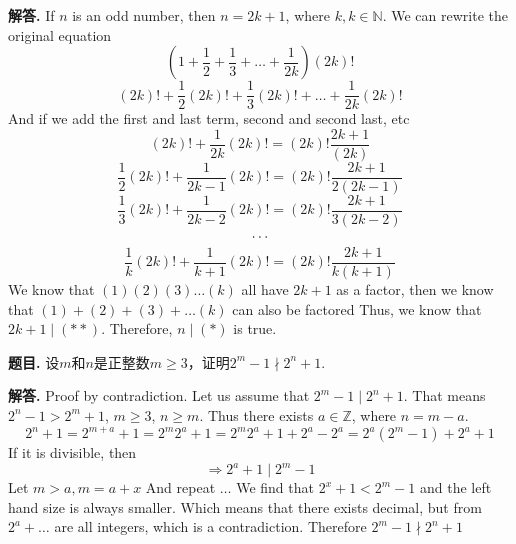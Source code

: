 \documentclass[12pt, a4paper, oneside]{article}
\newcounter{problemname}
\newenvironment{problem}{\begin{shaded}\stepcounter{problemname}\par\noindent\textbf{题目\arabic{problemname}. }}{\end{shaded}\par}
\newenvironment{solution}{\par\noindent\textbf{解答. }}{\par}
\begin{document}
\begin{CJK}{UTF8}{gbsn}
\begin{solution}
  If $n$ is an odd number, then $n=2k+1$, where $k,k\in\mathbb{N}$. We can rewrite the original equation
  $$ \left( 1 + \frac{1}{2} + \frac{1}{3} + \dots + \frac{1}{2k} \right) (2k)! $$ 
  \begin{equation}
    (2k)! + \frac{1}{2}(2k)! + \frac{1}{3}(2k)! + \dots + \frac{1}{2k}(2k)! \tag{**}
  \end{equation}
    And if we add the first and last term, second and second last, etc 
  \begin{equation}
   (2k)! + \frac{1}{2k}(2k)! =  (2k)!\frac{2k+1}{(2k)}
  \end{equation}
  \begin{equation}
    \frac{1}{2}(2k)! +  \frac{1}{2k-1}(2k)! = (2k)!\frac{2k+1}{2(2k-1)}
  \end{equation}
  \begin{equation}
    \frac{1}{3}(2k)! +  \frac{1}{2k-2}(2k)! = (2k)!\frac{2k+1}{3(2k-2)}
  \end{equation}
  \begin{equation}
    \dots \notag
  \end{equation}
  \begin{equation}
    \frac{1}{k}(2k)! +  \frac{1}{k + 1}(2k)! = (2k)!\frac{2k+1}{k(k+1)}
    \end{equation}
    We know that $(1)(2)(3)\dots(k)$ all have $2k+1$ as a factor, then we know that $(1)+(2)+(3)+\dots(k)$ can also be factored
    Thus, we know that $2k+1\mid (**)$. Therefore, $n\mid (*)$ is true.



\end{solution}

\begin{problem}
  设$m$和$n$是正整数$m\ge3$，证明$2^m-1\nmid 2^n+1$.
\end{problem}

\begin{solution}
   Proof by contradiction. Let us assume that $2^m-1\mid 2^n+1$.
   That means $2^n -1 > 2^m + 1$, $m \geq 3$, $n \ge m$. \newline
   Thus there exists $a \in \mathbb{Z}$, where $n = m -a$. 
   $$ 2^n + 1 = 2^{m+a} + 1 = 2^m2^a + 1 = 2^m2^a+1+2^a-2^a = 2^a(2^m - 1) + 2^a + 1$$
   If it is divisible, then
   $$ \Rightarrow 2^a + 1 \mid 2^m - 1$$
   Let $m>a, m=a+x$ \newline
   And repeat $\dots$ \newline
   We find that  $2^x + 1 < 2^m -1$ and the left hand size is always smaller. Which means that there exists decimal,
   but from $2^a + \dots$ are all integers, which is a contradiction. Therefore $2^m-1\nmid 2^n+1$
\end{solution}




\end{CJK}
\end{document}
